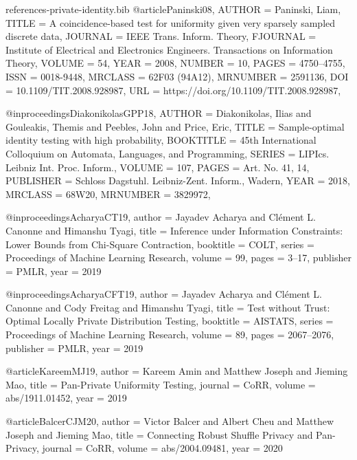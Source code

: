 \documentclass[10pt]{article}
\begin{document}
\begin{filecontents}{references-private-identity.bib}
@article{Paninski08,
    AUTHOR = {Paninski, Liam},
     TITLE = {A coincidence-based test for uniformity given very sparsely
              sampled discrete data},
   JOURNAL = {IEEE Trans. Inform. Theory},
  FJOURNAL = {Institute of Electrical and Electronics Engineers.
              Transactions on Information Theory},
    VOLUME = {54},
      YEAR = {2008},
    NUMBER = {10},
     PAGES = {4750--4755},
      ISSN = {0018-9448},
   MRCLASS = {62F03 (94A12)},
  MRNUMBER = {2591136},
       DOI = {10.1109/TIT.2008.928987},
       URL = {https://doi.org/10.1109/TIT.2008.928987},
}

@inproceedings{DiakonikolasGPP18,
    AUTHOR = {Diakonikolas, Ilias and Gouleakis, Themis and Peebles, John
              and Price, Eric},
     TITLE = {Sample-optimal identity testing with high probability},
 BOOKTITLE = {45th {I}nternational {C}olloquium on {A}utomata, {L}anguages,
              and {P}rogramming},
    SERIES = {LIPIcs. Leibniz Int. Proc. Inform.},
    VOLUME = {107},
     PAGES = {Art. No. 41, 14},
 PUBLISHER = {Schloss Dagstuhl. Leibniz-Zent. Inform., Wadern},
      YEAR = {2018},
   MRCLASS = {68W20},
  MRNUMBER = {3829972},
}

@inproceedings{AcharyaCT19,
  author    = {Jayadev Acharya and
               Cl{\'{e}}ment L. Canonne and
               Himanshu Tyagi},
  title     = {Inference under Information Constraints: Lower Bounds from Chi-Square
               Contraction},
  booktitle = {{COLT}},
  series    = {Proceedings of Machine Learning Research},
  volume    = {99},
  pages     = {3--17},
  publisher = {{PMLR}},
  year      = {2019}
}


@inproceedings{AcharyaCFT19,
  author    = {Jayadev Acharya and
               Cl{\'{e}}ment L. Canonne and
               Cody Freitag and
               Himanshu Tyagi},
  title     = {Test without Trust: Optimal Locally Private Distribution Testing},
  booktitle = {{AISTATS}},
  series    = {Proceedings of Machine Learning Research},
  volume    = {89},
  pages     = {2067--2076},
  publisher = {{PMLR}},
  year      = {2019}
}

@article{KareemMJ19,
  author    = {Kareem Amin and
               Matthew Joseph and
               Jieming Mao},
  title     = {Pan-Private Uniformity Testing},
  journal   = {CoRR},
  volume    = {abs/1911.01452},
  year      = {2019}
}

@article{BalcerCJM20,
  author    = {Victor Balcer and
               Albert Cheu and
               Matthew Joseph and
               Jieming Mao},
  title     = {Connecting Robust Shuffle Privacy and Pan-Privacy},
  journal   = {CoRR},
  volume    = {abs/2004.09481},
  year      = {2020}
}


\end{filecontents}
\end{document}
